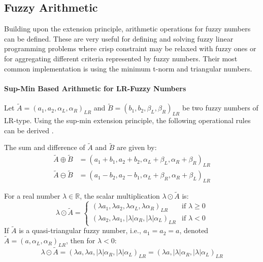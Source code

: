 


\subsection{Fuzzy Arithmetic}
\label{sec:fuzzy_arithmetic}

Building upon the extension principle, arithmetic operations for fuzzy numbers can be defined. These are very useful for defining and solving fuzzy linear programming problems where crisp constraint may be relaxed with fuzzy ones or for aggregating different criteria represented by fuzzy numbers. Their most common implementation is using the minimum t-norm and triangular numbers.

\paragraph{Sup-Min Based Arithmetic for LR-Fuzzy Numbers}
Let $\tilde{A} = (a_1, a_2, \alpha_L, \alpha_R)_{LR}$ and $\tilde{B} = (b_1, b_2, \beta_L, \beta_R)_{LR}$ be two fuzzy numbers of LR-type. Using the sup-min extension principle, the following operational rules can be derived \cite[p.16]{FULLER2}.

\begin{proposition}
\label{prop:lr_add_sub}
The sum and difference of $\tilde{A}$ and $\tilde{B}$ are given by:
\begin{align}
\tilde{A} \oplus \tilde{B} &= (a_1+b_1, a_2+b_2, \alpha_L+\beta_L, \alpha_R+\beta_R)_{LR} \\
\tilde{A} \ominus \tilde{B} &= (a_1-b_2, a_2-b_1, \alpha_L+\beta_R, \alpha_R+\beta_L)_{LR}
\end{align}
\end{proposition}

\begin{proposition}
\label{prop:lr_scalar_mult}
For a real number $\lambda \in \mathbb{R}$, the scalar multiplication $\lambda \odot \tilde{A}$ is:
\begin{equation}
\lambda \odot \tilde{A} =
\begin{cases}
(\lambda a_1, \lambda a_2, \lambda\alpha_L, \lambda\alpha_R)_{LR} & \text{if } \lambda \ge 0 \\
(\lambda a_2, \lambda a_1, |\lambda|\alpha_R, |\lambda|\alpha_L)_{LR} & \text{if } \lambda < 0
\end{cases}
\end{equation}
If $\tilde{A}$ is a quasi-triangular fuzzy number, i.e., $a_1=a_2=a$, denoted $\tilde{A}=(a, \alpha_L, \alpha_R)_{LR}$, then for $\lambda < 0$:
\begin{equation}
\lambda \odot \tilde{A} = (\lambda a, \lambda a, |\lambda|\alpha_R, |\lambda|\alpha_L)_{LR} = (\lambda a, |\lambda|\alpha_R, |\lambda|\alpha_L)_{LR}
\end{equation}
\end{proposition}

